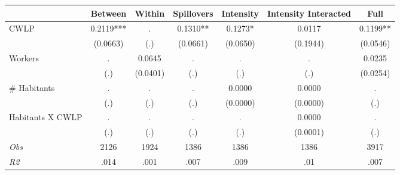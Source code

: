 \begin{tabular}{l*{6}{c}}\hline&\multicolumn{1}{c}{Between}&\multicolumn{1}{c}{Within}&\multicolumn{1}{c}{Spillovers}&\multicolumn{1}{c}{Intensity}&\multicolumn{1}{c}{Intensity Interacted}&\multicolumn{1}{c}{Full}\\ \hline 
CWLP & 0.2119*** & . & 0.1310** & 0.1273* & 0.0117 & 0.1199** \\
 & (0.0663) & (.) & (0.0661) & (0.0650) & (0.1944) & (0.0546) \\
Workers & . & 0.0645 & . & . & . & 0.0235 \\
 & (.) & (0.0401) & (.) & (.) & (.) & (0.0254) \\
\# Habitants & . & . & . & 0.0000 & 0.0000 & . \\
 & (.) & (.) & (.) & (0.0000) & (0.0000) & (.) \\
Habitants X CWLP & . & . & . & . & 0.0000 & . \\
 & (.) & (.) & (.) & (.) & (0.0001) & (.) \\
\hline \textit{Obs} & 2126 & 1924 & 1386 & 1386 & 1386 & 3917 \\ \textit{R2} & .014 & .001 & .007 & .009 & .01 & .007 \\ \hline \end{tabular}
